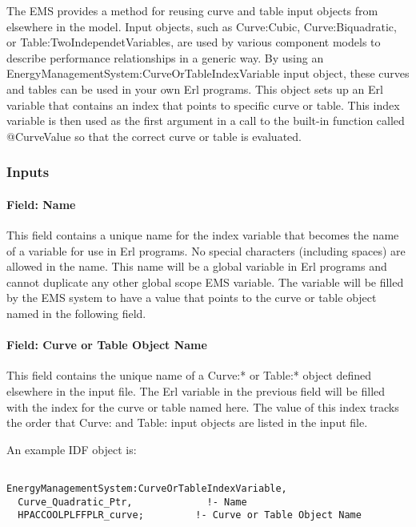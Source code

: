 The EMS provides a method for reusing curve and table input objects from elsewhere in the model. Input objects, such as Curve:Cubic, Curve:Biquadratic, or Table:TwoIndependetVariables, are used by various component models to describe performance relationships in a generic way. By using an EnergyManagementSystem:CurveOrTableIndexVariable input object, these curves and tables can be used in your own Erl programs. This object sets up an Erl variable that contains an index that points to specific curve or table. This index variable is then used as the first argument in a call to the built-in function called @CurveValue so that the correct curve or table is evaluated.

\subsubsection{Inputs}\label{inputs-9-005}

\paragraph{Field: Name}\label{field-name-9-005}

This field contains a unique name for the index variable that becomes the name of a variable for use in Erl programs. No special characters (including spaces) are allowed in the name. This name will be a global variable in Erl programs and cannot duplicate any other global scope EMS variable. The variable will be filled by the EMS system to have a value that points to the curve or table object named in the following field.

\paragraph{Field: Curve or Table Object Name}\label{field-curve-or-table-object-name}

This field contains the unique name of a Curve:* or Table:* object defined elsewhere in the input file. The Erl variable in the previous field will be filled with the index for the curve or table named here. The value of this index tracks the order that Curve: and Table: input objects are listed in the input file.

An example IDF object is:

\begin{lstlisting}

EnergyManagementSystem:CurveOrTableIndexVariable,
  Curve_Quadratic_Ptr,             !- Name
  HPACCOOLPLFFPLR_curve;         !- Curve or Table Object Name
\end{lstlisting}

